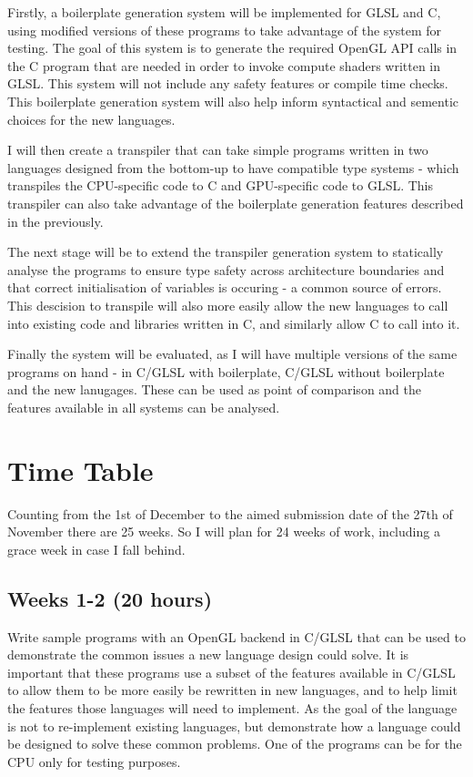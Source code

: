 \documentclass[11pt]{article}
\begin{document}
Firstly, a boilerplate generation system will be implemented for GLSL and C,
using modified versions of these programs to take advantage of the system for
testing. The goal of this system is to generate the required OpenGL API calls
in the C program that are needed in order to invoke compute shaders written in
GLSL. This system will not include any safety features or compile time checks.
This boilerplate generation system will also help inform syntactical and
sementic choices for the new languages.

I will then create a transpiler that can take simple programs written in two
languages designed from the bottom-up to have compatible type systems - which
transpiles the CPU-specific code to C and GPU-specific code to GLSL. This
transpiler can also take advantage of the boilerplate generation features
described in the previously.

The next stage will be to extend the transpiler generation system to statically
analyse the programs to ensure type safety across architecture boundaries and
that correct initialisation of variables is occuring - a common source of
errors. This descision to transpile will also more easily allow the new
languages to call into existing code and libraries written in C, and similarly
allow C to call into it.

Finally the system will be evaluated, as I will have multiple versions of the
same programs on hand - in C/GLSL with boilerplate, C/GLSL without boilerplate
and the new lanugages. These can be used as point of comparison and the
features available in all systems can be analysed.




\newpage
\appendix

\section{Time Table}

Counting from the 1st of December to the aimed submission date of the 27th of
November there are 25 weeks. So I will plan for 24 weeks of work, including a
grace week in case I fall behind.

\subsection{Weeks 1-2 (20 hours)}

Write sample programs with an OpenGL backend in C/GLSL that can be used to
demonstrate the common issues a new language design could solve. It is
important that these programs use a subset of the features available in C/GLSL
to allow them to be more easily be rewritten in new languages, and to help
limit the features those languages will need to implement. As the goal of the
language is not to re-implement existing languages, but demonstrate how a
language could be designed to solve these common problems. One of the programs
can be for the CPU only for testing purposes.
\end{document}
